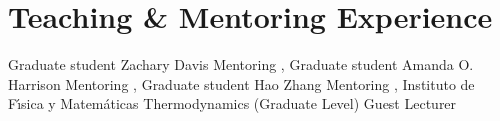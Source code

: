 \section{Teaching \& Mentoring Experience}

%
{Graduate student}%
{Zachary Davis \textnormal{\cite{Davis:2021ru}}}%
{Mentoring}%
{\DPA, \Purdue}%
{}
%
%
{Graduate student}%
{Amanda O. Harrison \textnormal{\cite{RuedaBecerril:2021ha}}}%
{Mentoring}%
{\DPA, \Purdue}%
{}
%
%
{Graduate student}%
{Hao Zhang \textnormal{\cite{Zhang:2020ch}}}%
{Mentoring}%
{\DPA, \Purdue}%
{}
%
%
{Instituto de F\'{\i}sica y Matem\'{a}ticas}%
{Thermodynamics (Graduate Level)}%
{Guest Lecturer}%
{\UMSNHes}%
{}

